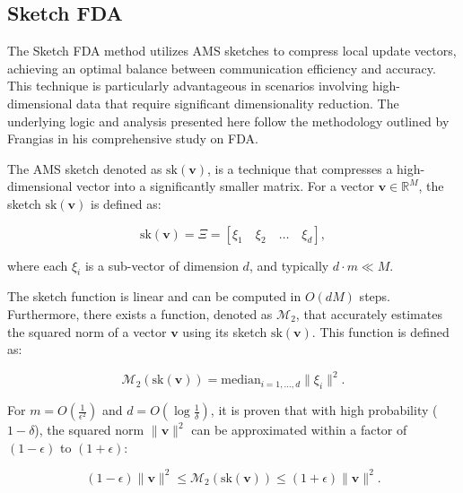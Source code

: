 \subsection{Sketch FDA}
The Sketch FDA method utilizes AMS sketches\cite{garofalakisSketchbasedGeometricMonitoring2013} to compress local update vectors, achieving an optimal
balance between communication efficiency and accuracy. This technique is particularly advantageous in scenarios involving high-dimensional data that require
significant dimensionality reduction. The underlying logic and analysis presented here follow the methodology outlined by Frangias\cite{frangiasgeorgiosFederatedLearningTensorFlow2023}
in his comprehensive study on FDA.

The AMS sketch denoted as \( \text{sk}( \mathbf{v} ) \), is a technique that compresses
a high-dimensional vector into a significantly smaller matrix. For a vector \( \mathbf{v} \in \mathbb{R}^M \), the sketch \( \text{sk}( \mathbf{v} ) \)
is defined as:

\begin{equation}
    \text{sk}( \mathbf{v} ) = \Xi = [ \xi_1 \quad \xi_2 \quad \ldots \quad \xi_d ],
    \label{eq:sketch_definition}
\end{equation}

\noindent
where each \( \xi_i \) is a sub-vector of dimension \( d \), and typically \( d \cdot m \ll M \).

The sketch function is linear and can be computed in \( O(dM) \) steps. Furthermore, there exists a function, denoted as \( \mathcal{M}_2 \), that accurately
estimates the squared norm of a vector \( \mathbf{v} \) using its sketch \( \text{sk}( \mathbf{v} ) \). This function is defined as:

\begin{equation}
    \mathcal{M}_2(\text{sk}(\mathbf{v})) = \text{median}_{i=1,\ldots,d} \| \xi_i \|^2.
    \label{eq:squared_norm_estimate}
\end{equation}

\noindent
For \( m = O \left( \frac{1}{\epsilon^2} \right) \) and \( d = O \left( \log \frac{1}{\delta} \right) \), it is proven that with high probability (\( 1 - \delta \)),
the squared norm \( \| \mathbf{v} \|^2 \) can be approximated within a factor of \( (1 - \epsilon) \) to \( (1 + \epsilon) \):

\begin{equation}
    (1 - \epsilon) \| \mathbf{v} \|^2 \leq \mathcal{M}_2(\text{sk}(\mathbf{v})) \leq (1 + \epsilon) \| \mathbf{v} \|^2.
    \label{eq:approximation}
\end{equation}

